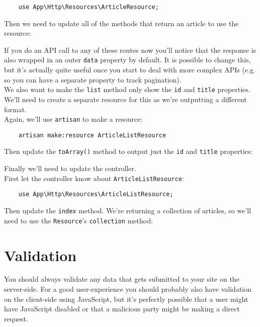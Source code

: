 \begin{verbatim}
    use App\Http\Resources\ArticleResource;
\end{verbatim}

Then we need to update all of the methods that return an article to use the resource:


If you do an API call to any of these routes now you'll notice that the response is also wrapped in an outer \texttt{data} property by default. It is possible to change this, but it's actually quite useful once you start to deal with more complex APIs (e.g. so you can have a separate property to track pagination).
\\

We also want to make the \texttt{list} method only show the \texttt{id} and \texttt{title} properties. We'll need to create a separate resource for this as we're outputting a different format.
\\

Again, we'll use \texttt{artisan} to make a resource:

\begin{verbatim}
    artisan make:resource ArticleListResource
\end{verbatim}

Then update the \texttt{toArray()} method to output just the \texttt{id} and \texttt{title} properties:


Finally we'll need to update the controller.
\\

First let the controller know about \texttt{ArticleListResource}:

\begin{verbatim}
    use App\Http\Resources\ArticleListResource;
\end{verbatim}

Then update the \texttt{index} method. We're returning a collection of articles, so we'll need to use the \texttt{Resource}'s \texttt{collection} method:



\section{Validation}

You should always validate any data that gets submitted to your site on the server-side. For a good user-experience you should probably also have validation on the client-side using JavaScript, but it's perfectly possible that a user might have JavaScript disabled or that a malicious party might be making a direct request.
\\

